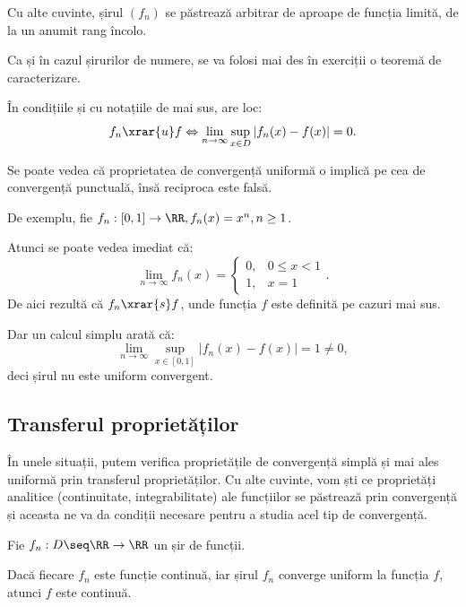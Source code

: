 Cu alte cuvinte, șirul $ (f_n) $ se păstrează arbitrar de aproape de funcția limită,
de la un anumit rang încolo.

Ca și în cazul șirurilor de numere, se va folosi mai des în exerciții o teoremă
de caracterizare.

\begin{proposition}\label{prop:conv-u}
  În condițiile și cu notațiile de mai sus, are loc:
  \[
    f_n \xrar{u} f \Leftrightarrow \lim_{n \to \infty} \sup_{x \in D} |f_n(x) - f(x)| = 0.
  \]
\end{proposition}

Se poate vedea că proprietatea de convergență uniformă o implică pe cea de 
convergență punctuală, însă reciproca este falsă.

De exemplu, fie $ f_n : [0, 1] \to \RR, f_n(x) = x^n, n \geq 1 $.

Atunci se poate vedea imediat că:
\[
  \lim_{n \to \infty} f_n(x) = %
  \begin{cases}
    0, & 0 \leq x < 1 \\
    1, & x = 1
  \end{cases}.
\]
De aici rezultă că $ f_n \xrar{s} f $, unde funcția $ f $ este definită pe cazuri
mai sus.

Dar un calcul simplu arată că:
\[
  \lim_{n \to \infty} \sup_{x \in [0, 1]} |f_n(x) - f(x)| = 1 \neq 0,
\]
deci șirul nu este uniform convergent.


\subsection{Transferul proprietăților}

În unele situații, putem verifica proprietățile de convergență simplă și
mai ales uniformă prin transferul proprietăților. Cu alte cuvinte, vom ști
ce proprietăți analitice (continuitate, integrabilitate) ale funcțiilor se
păstrează prin convergență și aceasta ne va da condiții necesare pentru
a studia acel tip de convergență.

\begin{theorem}\label{thm:transfer-cont}
  Fie $ f_n : D \seq \RR \to \RR $ un șir de funcții.

  Dacă fiecare $ f_n $ este funcție continuă, iar șirul $ f_n $ converge uniform
  la funcția $ f $, atunci $ f $ este continuă.
\end{theorem}

